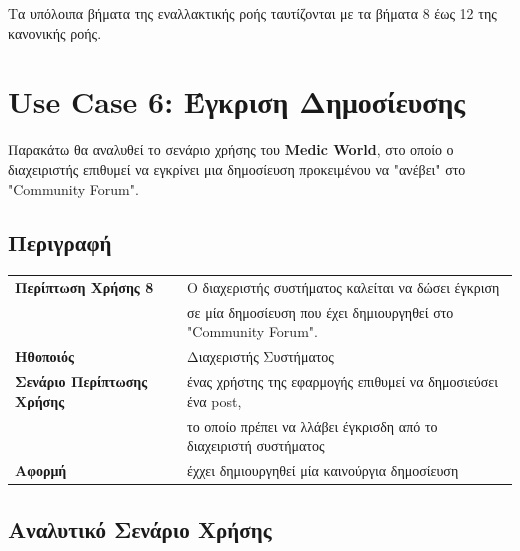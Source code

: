 \documentclass{article}
\newcommand\T{\rule{0pt}{2.6ex}}       %
\newcommand\B{\rule[-1.2ex]{0pt}{0pt}}
\begin{document}
\par Τα υπόλοιπα βήματα της εναλλακτικής ροής ταυτίζονται με τα βήματα 8 έως 12 της κανονικής ροής.

\section{Use Case 6: Έγκριση Δημοσίευσης}

Παρακάτω θα αναλυθεί το σενάριο χρήσης του \textbf{Medic World}, στο οποίο ο διαχειριστής επιθυμεί να εγκρίνει μια δημοσίευση προκειμένου να "ανέβει" στο "Community Forum".

\subsection{Περιγραφή}

\begin{center}
     \begin{tabular}{|l|l|}
     \hline
      \textbf{Περίπτωση Χρήσης 8} & Ο διαχεριστής συστήματος καλείται να δώσει έγκριση \T \\& σε μία δημοσίευση που έχει δημιουργηθεί στο "Community Forum". \B \\ 
      \hline
      \textbf{Ηθοποιός} & Διαχεριστής Συστήματος\T\B \\
      \hline
      \textbf{Σενάριο Περίπτωσης Χρήσης} & ένας χρήστης της εφαρμογής επιθυμεί να δημοσιεύσει ένα post, \T \\&  το οποίο πρέπει να λλάβει έγκρισδη από το διαχειριστή συστήματος\B \\
      \hline
      \textbf{Αφορμή} &  έχχει δημιουργηθεί μία καινούργια δημοσίευση\T\B \\
      \hline
     \end{tabular}
 \end{center}
 
 \subsection{ Αναλυτικό Σενάριο Χρήσης}
 
\end{document}
